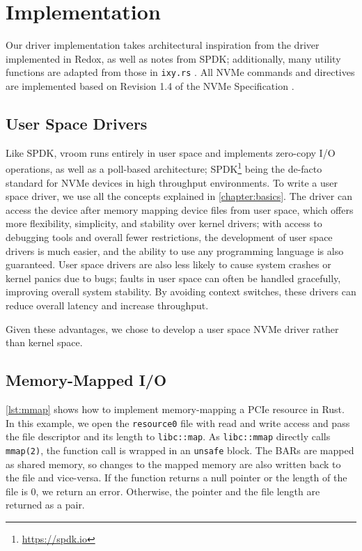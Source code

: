 \chapter{Implementation}\label{chapter:implementation}
Our driver implementation takes architectural inspiration from the driver implemented in Redox, as well as notes from SPDK; additionally, many utility functions are adapted from those in \texttt{ixy.rs} \cite{ixy.rs}. All NVMe commands and directives are implemented based on Revision 1.4 of the NVMe Specification \cite{nvme-spec}.

\section{User Space Drivers}
Like SPDK, vroom runs entirely in user space and implements zero-copy I/O operations, as well as a poll-based architecture; SPDK\footnote{\url{https://spdk.io}} being the de-facto standard for NVMe devices in high throughput environments. To write a user space driver, we use all the concepts explained in \autoref{chapter:basics}. The driver can access the device after memory mapping device files from user space, which offers more flexibility, simplicity, and stability over kernel drivers; with access to debugging tools and overall fewer restrictions, the development of user space drivers is much easier, and the ability to use any programming language is also guaranteed. User space drivers are also less likely to cause system crashes or kernel panics due to bugs; faults in user space can often be handled gracefully, improving overall system stability. By avoiding context switches, these drivers can reduce overall latency and increase throughput.

Given these advantages, we chose to develop a user space NVMe driver rather than kernel space.

\section{Memory-Mapped I/O}\label{section:MMIO}

\autoref{lst:mmap} shows how to implement memory-mapping a PCIe resource in Rust. In this example, we open the \texttt{resource0} file with read and write access and pass the file descriptor and its length to \texttt{libc::map}. As \texttt{libc::mmap} directly calls \texttt{mmap(2)}, the function call is wrapped in an \texttt{unsafe} block. The BARs are mapped as shared memory, so changes to the mapped memory are also written back to the file and vice-versa. If the function returns a null pointer or the length of the file is 0, we return an error. Otherwise, the pointer and the file length are returned as a pair.

